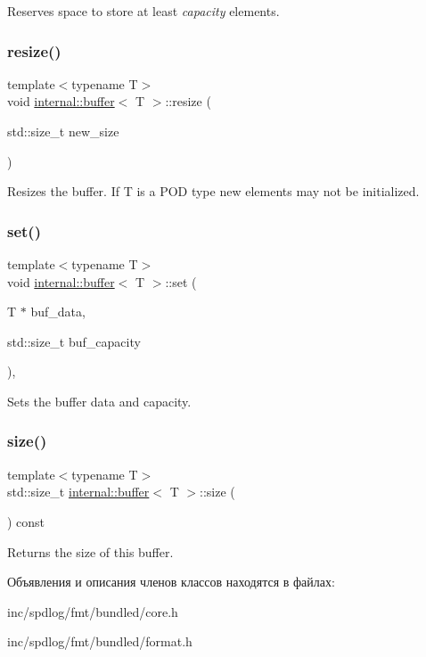 Reserves space to store at least {\itshape capacity} elements. \mbox{\label{classinternal_1_1buffer_a4d38f4fdc2d4ca913a5a13523b690893}} 
\subsubsection{\texorpdfstring{resize()}{resize()}}
{\footnotesize\ttfamily template$<$typename T$>$ \\
void \hyperlink{classinternal_1_1buffer}{internal\+::buffer}$<$ T $>$\+::resize (\begin{DoxyParamCaption}\item[{std\+::size\+\_\+t}]{new\+\_\+size }\end{DoxyParamCaption})\hspace{0.3cm}{\ttfamily [inline]}}

Resizes the buffer. If T is a P\+OD type new elements may not be initialized. \mbox{\label{classinternal_1_1buffer_a0c5d6939cc27e8be6ae5e7bede1e3ae8}} 
\subsubsection{\texorpdfstring{set()}{set()}}
{\footnotesize\ttfamily template$<$typename T$>$ \\
void \hyperlink{classinternal_1_1buffer}{internal\+::buffer}$<$ T $>$\+::set (\begin{DoxyParamCaption}\item[{T $\ast$}]{buf\+\_\+data,  }\item[{std\+::size\+\_\+t}]{buf\+\_\+capacity }\end{DoxyParamCaption})\hspace{0.3cm}{\ttfamily [inline]}, {\ttfamily [protected]}}

Sets the buffer data and capacity. \mbox{\label{classinternal_1_1buffer_abac844b364cd93450a9c311807d15f80}} 
\subsubsection{\texorpdfstring{size()}{size()}}
{\footnotesize\ttfamily template$<$typename T$>$ \\
std\+::size\+\_\+t \hyperlink{classinternal_1_1buffer}{internal\+::buffer}$<$ T $>$\+::size (\begin{DoxyParamCaption}{ }\end{DoxyParamCaption}) const\hspace{0.3cm}{\ttfamily [inline]}}

Returns the size of this buffer. 

Объявления и описания членов классов находятся в файлах\+:\begin{DoxyCompactItemize}
\item 
inc/spdlog/fmt/bundled/core.\+h\item 
inc/spdlog/fmt/bundled/format.\+h\end{DoxyCompactItemize}
